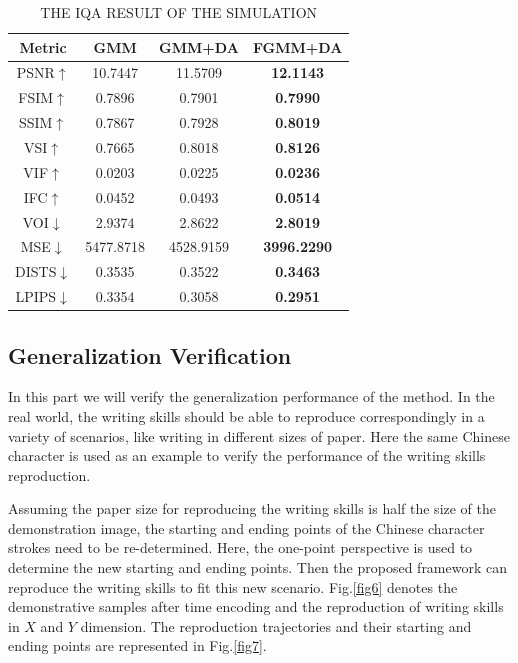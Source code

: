 \documentclass[journal]{IEEEtran}
\begin{document}
\begin{table}[!t]
    \centering  
    \caption{THE IQA RESULT OF THE SIMULATION}
    \label{tab2}
    \begin{tabular}{cccc}
    \toprule
    Metric & GMM & GMM+DA & \textbf{FGMM+DA} \\
    \midrule
    PSNR$\uparrow$ & 10.7447 & 11.5709 & \textbf{12.1143} \\
    FSIM$\uparrow$ & 0.7896 & 0.7901 & \textbf{0.7990} \\
    SSIM$\uparrow$ & 0.7867 & 0.7928 & \textbf{0.8019} \\
    VSI$\uparrow$ & 0.7665 & 0.8018 & \textbf{0.8126} \\
    VIF$\uparrow$ & 0.0203 & 0.0225 & \textbf{0.0236} \\
    IFC$\uparrow$ & 0.0452 & 0.0493 & \textbf{0.0514} \\
    VOI$\downarrow$ & 2.9374 & 2.8622 & \textbf{2.8019} \\
    MSE$\downarrow$ & 5477.8718 & 4528.9159 & \textbf{3996.2290} \\
    DISTS$\downarrow$ & 0.3535 & 0.3522 & \textbf{0.3463} \\
    LPIPS$\downarrow$ & 0.3354 & 0.3058 & \textbf{0.2951} \\
    \bottomrule
    \end{tabular}
\end{table}

\subsection{Generalization Verification}
In this part we will verify the generalization performance of the method. In the real world, the writing skills should be able to reproduce correspondingly in a variety of scenarios, like writing in different sizes of paper. Here the same Chinese character is used as an example to verify the performance of the writing skills reproduction.

Assuming the paper size for reproducing the writing skills is half the size of the demonstration image, the starting and ending points of the Chinese character strokes need to be re-determined. Here, the one-point perspective is used to determine the new starting and ending points. Then the proposed framework can reproduce the writing skills to fit this new scenario. Fig.\ref{fig6} denotes the demonstrative samples after time encoding and the reproduction of writing skills in $X$ and $Y$ dimension. The reproduction trajectories and their starting and ending points are represented in Fig.\ref{fig7}.
\end{document}
